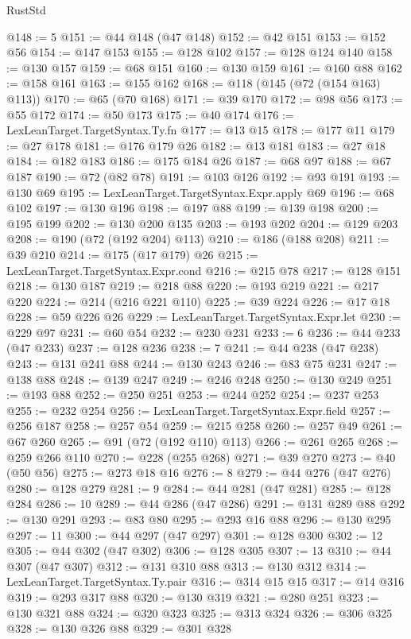 \begin{lexlean}{RustStd}
\begin{coremodule}
@148 := 5
@151 := @44 @148 (@47 @148)
@152 := @42 @151
@153 := @152 @56
@154 := @147 @153
@155 := @128 @102
@157 := @128 @124 @140
@158 := @130 @157
@159 := @68 @151
@160 := @130 @159
@161 := @160 @88
@162 := @158 @161
@163 := @155 @162
@168 := @118 (@145 (@72 (@154 @163) @113))
@170 := @65 (@70 @168)
@171 := @39 @170
@172 := @98 @56
@173 := @55 @172
@174 := @50 @173
@175 := @40 @174
@176 := LexLeanTarget.TargetSyntax.Ty.fn
@177 := @13 @15
@178 := @177 @11
@179 := @27 @178
@181 := @176 @179 @26
@182 := @13 @181
@183 := @27 @18
@184 := @182 @183
@186 := @175 @184 @26
@187 := @68 @97
@188 := @67 @187
@190 := @72 (@82 @78)
@191 := @103 @126
@192 := @93 @191
@193 := @130 @69
@195 := LexLeanTarget.TargetSyntax.Expr.apply @69
@196 := @68 @102
@197 := @130 @196
@198 := @197 @88
@199 := @139 @198
@200 := @195 @199
@202 := @130 @200 @135
@203 := @193 @202
@204 := @129 @203
@208 := @190 (@72 (@192 @204) @113)
@210 := @186 (@188 @208)
@211 := @39 @210
@214 := @175 (@17 @179) @26
@215 := LexLeanTarget.TargetSyntax.Expr.cond
@216 := @215 @78
@217 := @128 @151
@218 := @130 @187
@219 := @218 @88
@220 := @193 @219
@221 := @217 @220
@224 := @214 (@216 @221 @110)
@225 := @39 @224
@226 := @17 @18
@228 := @59 @226 @26
@229 := LexLeanTarget.TargetSyntax.Expr.let
@230 := @229 @97
@231 := @60 @54
@232 := @230 @231
@233 := 6
@236 := @44 @233 (@47 @233)
@237 := @128 @236
@238 := 7
@241 := @44 @238 (@47 @238)
@243 := @131 @241 @88
@244 := @130 @243
@246 := @83 @75 @231
@247 := @138 @88
@248 := @139 @247
@249 := @246 @248
@250 := @130 @249
@251 := @193 @88
@252 := @250 @251
@253 := @244 @252
@254 := @237 @253
@255 := @232 @254
@256 := LexLeanTarget.TargetSyntax.Expr.field
@257 := @256 @187
@258 := @257 @54
@259 := @215 @258
@260 := @257 @49
@261 := @67 @260
@265 := @91 (@72 (@192 @110) @113)
@266 := @261 @265
@268 := @259 @266 @110
@270 := @228 (@255 @268)
@271 := @39 @270
@273 := @40 (@50 @56)
@275 := @273 @18 @16
@276 := 8
@279 := @44 @276 (@47 @276)
@280 := @128 @279
@281 := 9
@284 := @44 @281 (@47 @281)
@285 := @128 @284
@286 := 10
@289 := @44 @286 (@47 @286)
@291 := @131 @289 @88
@292 := @130 @291
@293 := @83 @80
@295 := @293 @16 @88
@296 := @130 @295
@297 := 11
@300 := @44 @297 (@47 @297)
@301 := @128 @300
@302 := 12
@305 := @44 @302 (@47 @302)
@306 := @128 @305
@307 := 13
@310 := @44 @307 (@47 @307)
@312 := @131 @310 @88
@313 := @130 @312
@314 := LexLeanTarget.TargetSyntax.Ty.pair
@316 := @314 @15 @15
@317 := @14 @316
@319 := @293 @317 @88
@320 := @130 @319
@321 := @280 @251
@323 := @130 @321 @88
@324 := @320 @323
@325 := @313 @324
@326 := @306 @325
@328 := @130 @326 @88
@329 := @301 @328

\end{coremodule}
\end{lexlean}

